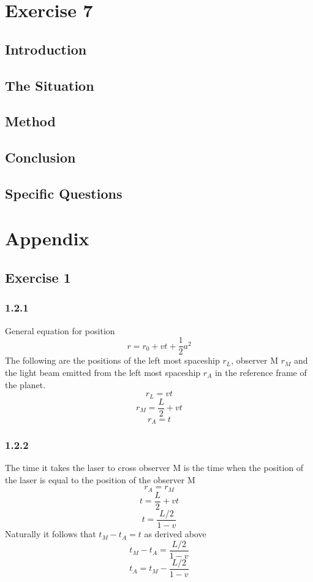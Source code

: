 \documentclass[reprint,english,notitlepage]{revtex4-2}
\begin{document}
\section{Exercise 7}

  \subsection{Introduction}

  \subsection{The Situation}

  \subsection{Method}

  \subsection{Conclusion} 

  \subsection{Specific Questions}



\section{Appendix} \label{sec: appendix}
\subsection{Exercise 1}
\subsubsection*{1.2.1}\label{1.2.1}
General equation for position
\[
r = r_0 + vt + \frac{1}{2} a^{2}
\]
The following are the positions of the left most spaceship $ r_L $, observer M $ r_M $ and the light beam emitted from the left most spaceship $ r_A $ in the reference frame of the planet.
\[
r_L = vt
\]
\[
r_M = \frac{L}{2} + vt
\]
\[
r_A = t
\]
\subsubsection*{1.2.2}\label{1.2.2}
The time it takes the laser to cross observer M is the time when the position of the laser is equal to the position of the observer M
\[
r_A = r_M
\]
\[
t = \frac{L}{2} + vt
\]
\[
t = \frac{L / 2}{1 - v}
\]  
Naturally it follows that $ t_M - t_A = t $ as derived above
\[
t_M - t_A = \frac{L / 2}{1 - v}
\]
\[
t_A = t_M - \frac{L / 2}{1 - v}
\]
\end{document}
